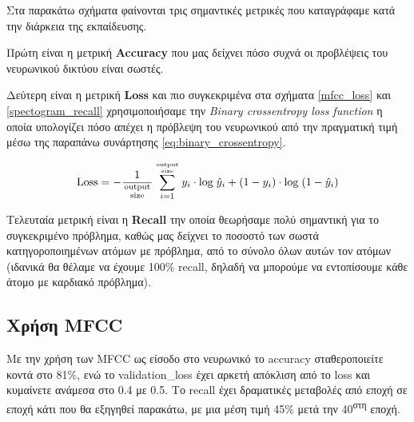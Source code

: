 \documentclass[../main.tex]{subfiles}
\begin{document}
Στα παρακάτω σχήματα φαίνονται τρις σημαντικές μετρικές που καταγράφαμε κατά την
διάρκεια της εκπαίδευσης.

Πρώτη είναι η μετρική \textbf{Accuracy} που μας δείχνει πόσο συχνά οι προβλέψεις
του νευρωνικού δικτύου είναι σωστές.

Δεύτερη είναι η μετρική \textbf{Loss} και πιο συγκεκριμένα στα σχήματα
\ref{mfcc_loss} και \ref{spectogram_recall} χρησιμοποιήσαμε την \textit{Binary
	crossentropy loss function} η οποία υπολογίζει πόσο απέχει η πρόβλεψη του
νευρωνικού από την πραγματική τιμή μέσω της παραπάνω συνάρτησης
\ref{eq:binary_crossentropy}.

\begin{equation}\label{eq:binary_crossentropy}
	\mathrm{Loss} = - \frac{1}{\mathrm{output \atop size}} \sum_{i=1}^{\mathrm{output \atop size}} y_i \cdot \mathrm{log}\; {\hat{y}}_i + (1-y_i) \cdot \mathrm{log}\; (1-{\hat{y}}_i)
\end{equation}

Τελευταία μετρική είναι η \textbf{Recall} την οποία θεωρήσαμε πολύ σημαντική για
το συγκεκριμένο πρόβλημα, καθώς μας δείχνει το ποσοστό των σωστά
κατηγοροποιημένων ατόμων με πρόβλημα, από το σύνολο όλων αυτών τον ατόμων
(ιδανικά θα θέλαμε να έχουμε 100\% recall, δηλαδή να μπορούμε να εντοπίσουμε
κάθε άτομο με καρδιακό πρόβλημα).

\subsection{Χρήση MFCC}

Με την χρήση των MFCC ως είσοδο στο νευρωνικό το accuracy σταθεροποιείτε κοντά
στο 81\%, ενώ το validation\_loss έχει αρκετή απόκλιση από το loss και κυμαίνετε
ανάμεσα στο 0.4 με 0.5. Το recall έχει δραματικές μεταβολές από εποχή σε εποχή
κάτι που θα εξηγηθεί παρακάτω, με μια μέση τιμή 45\% μετά την
40\textsuperscript{στη} εποχή.
\end{document}

